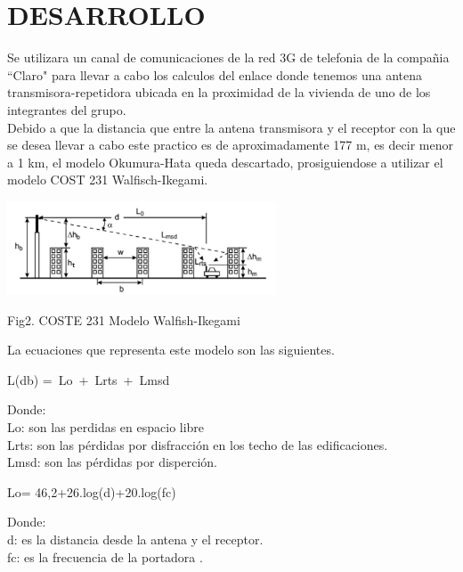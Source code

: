 \documentclass[conference, 9pt, a4paper]{IEEEtran}
\begin{document}
\section{DESARROLLO}
Se utilizara un canal de comunicaciones de la red 3G de telefonia de la compañia ``Claro" para llevar a cabo los calculos del enlace donde tenemos una antena transmisora-repetidora ubicada en la proximidad de la vivienda de uno de los integrantes del grupo.\\
Debido a que la distancia que entre la antena transmisora
y el receptor con la que se desea llevar a cabo este practico es de aproximadamente 177 m, es decir menor a 1 km, el modelo Okumura-Hata queda descartado, prosiguiendose a utilizar el modelo  COST 231 Walfisch-Ikegami.\\
\begin{center}
\includegraphics[width=8cm]{image/GRAFICAAA.PNG} 
\end{center}
\begin{center}
Fig2. COSTE 231 Modelo Walfish-Ikegami
\end{center}
La ecuaciones que representa este modelo son las siguientes.\\
\begin{center}
 L(db) =\ Lo\ +\ Lrts\ +\ Lmsd 
\end{center}
Donde:\\
Lo: son las perdidas en espacio libre\\
Lrts: son las pérdidas por disfracción en los techo de las edificaciones. \\
Lmsd: son las pérdidas por disperción.\\
\begin{center}
 Lo= 46,2+26.log(d)+20.log(fc)
\end{center}
Donde:\\
d: es la distancia desde la antena y el receptor.\\
fc: es la frecuencia de la portadora . \\
\end{document}
